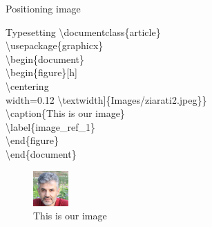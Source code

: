 \documentclass[10pt,xcolor={dvipsnames}]{beamer}
\begin{document}
		\begin{frame}{Positioning image}
			\begin{minipage}{.95\textwidth}
				\begin{block}{Typesetting}
					\textbackslash documentclass\{{\color{blue}article}\}\\
					\textbackslash usepackage\{{\color{orange}graphicx}\}\\
					\textbackslash begin\{{\color{blue}document}\}\\
						\quad\textbackslash begin\{{\color{orange}figure}\}[h]\\
							\qquad \textbackslash centering\\
							\qquad{\color{orange}\textbackslash includegraphics\{[}width=0.12 \textbackslash textwidth{\color{orange}]\{}Images/ziarati2.jpeg{\color{orange}\}\}}\\
							\qquad \textbackslash caption\{This is our image\}\\
							\qquad \textbackslash label\{image\_ref\_1\}\\
						\quad\textbackslash end\{{\color{orange}figure}\}\\
					\textbackslash end\{{\color{blue}document}\}\\
				\end{block}
			\end{minipage}
				
			\begin{figure}[h]
				\centering
				\includegraphics[width=0.12\textwidth]{Images/ziarati2.jpeg}
				\caption{This is our image}
				\label{image_ref_1}
			\end{figure}
			
		\end{frame}
	
\end{document}

